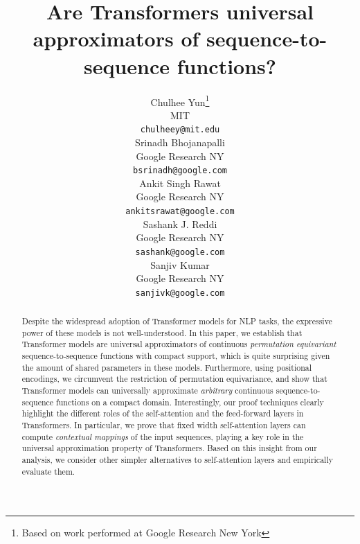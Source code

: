 \documentclass{article} %
\title{Are Transformers universal approximators of sequence-to-sequence functions?}
\author{Chulhee Yun\thanks{ Based on work performed at Google Research New York }\\
MIT\\
\texttt{chulheey@mit.edu} \\
\And
Srinadh Bhojanapalli\\
Google Research NY\\
\texttt{bsrinadh@google.com}\\
\And
Ankit Singh Rawat\\
Google Research NY\\
\texttt{ankitsrawat@google.com}\\
\And
Sashank J. Reddi\\
Google Research NY\\
\texttt{sashank@google.com}\\
\And
Sanjiv Kumar\\
Google Research NY\\
\texttt{sanjivk@google.com}
}
\begin{document}
\maketitle

\begin{abstract}
Despite the widespread adoption of Transformer models for NLP tasks, the expressive power of these models is not well-understood. In this paper, we establish that Transformer models are universal approximators of continuous {\em permutation equivariant} sequence-to-sequence functions with compact support, which is quite surprising given the amount of shared parameters in these models. Furthermore, using positional encodings, we circumvent the restriction of permutation equivariance, and show that Transformer models can universally approximate {\em arbitrary} continuous sequence-to-sequence functions on a compact domain. Interestingly, our proof techniques clearly highlight the different roles of the self-attention and the feed-forward layers in Transformers. In particular, we prove that fixed width self-attention layers can compute \emph{contextual mappings} of the input sequences, playing a key role in the universal approximation property of Transformers. Based on this insight from our analysis, we consider other simpler alternatives to self-attention layers and empirically evaluate them.
\end{abstract}



\end{document}
